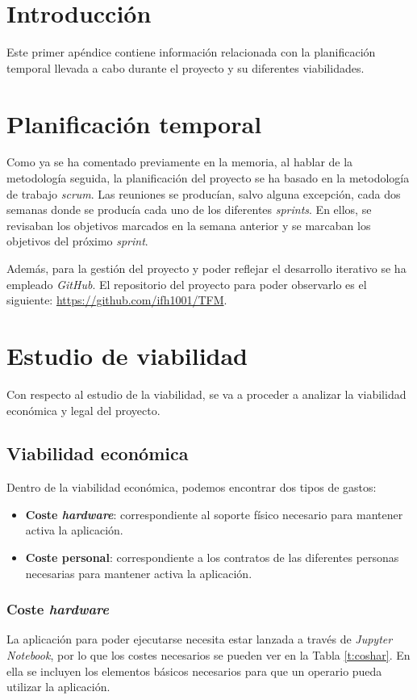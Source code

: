 
\section{Introducción}
Este primer apéndice contiene información relacionada con la planificación temporal llevada a cabo durante el proyecto y su diferentes viabilidades.

\section{Planificación temporal}
Como ya se ha comentado previamente en la memoria, al hablar de la metodología seguida, la planificación del proyecto se ha basado en la metodología de trabajo \emph{scrum}. Las reuniones se producían, salvo alguna excepción, cada dos semanas donde se producía cada uno de los diferentes \emph{sprints}. En ellos, se revisaban los objetivos marcados en la semana anterior y se marcaban los objetivos del próximo \emph{sprint}.

Además, para la gestión del proyecto y poder reflejar el desarrollo iterativo se ha empleado \emph{GitHub}. El repositorio del proyecto para poder observarlo es el siguiente: \url{https://github.com/ifh1001/TFM}.

\section{Estudio de viabilidad}
Con respecto al estudio de la viabilidad, se va a proceder a analizar la viabilidad económica y legal del proyecto.

\subsection{Viabilidad económica}
Dentro de la viabilidad económica, podemos encontrar dos tipos de gastos:
\begin{itemize}
    \item \textbf{Coste \emph{hardware}}: correspondiente al soporte físico necesario para mantener activa la aplicación.
    \item \textbf{Coste personal}: correspondiente a los contratos de las diferentes personas necesarias para mantener activa la aplicación. 
\end{itemize}
\subsubsection{Coste \emph{hardware}}
La aplicación para poder ejecutarse necesita estar lanzada a través de \emph{Jupyter Notebook}, por lo que los costes necesarios se pueden ver en la Tabla \ref{t:coshar}. En ella se incluyen los elementos básicos necesarios para que un operario pueda utilizar la aplicación.


